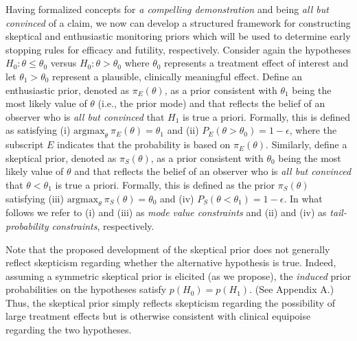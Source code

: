 \documentclass[12pt]{article}
\begin{document}
Having formalized concepts for \textit{a compelling demonstration} and  being \textit{all but convinced} of a claim, we now can develop a structured framework for constructing skeptical and enthusiastic monitoring priors which will be used to determine early stopping rules for efficacy and futility, respectively.
%
Consider again the hypotheses $H_0: \theta \le \theta_0$ versus $H_0: \theta > \theta_0$ where $\theta_0$ represents a 
treatment effect of interest and let $\theta_1>\theta_0$ represent a plausible, clinically meaningful effect.
%
Define an enthusiastic prior, denoted as $\pi_{E}(\theta)$, as a prior consistent with $\theta_1$ being the most 
likely value of $\theta$ (i.e., the prior mode) and that reflects the belief of an observer who is 
\textit{all but convinced} that $H_1$ is true a priori. 
%
Formally, this is defined as satisfying (i) $\text{argmax}_\theta~\pi_E(\theta)=\theta_1$
and (ii) $P_E(\theta >\theta_0)=1-\epsilon$, where the subscript $E$ indicates that the probability is 
based on $\pi_{E}(\theta)$.
%
Similarly, define a skeptical prior, denoted as $\pi_{S}(\theta)$, as a prior consistent with $\theta_0$ being the most 
likely value of $\theta$ and that reflects the belief of an observer who is \textit{all but convinced} that 
$\theta <\theta_1$ is true a priori. 
%
Formally, this is defined as the prior $\pi_{S}(\theta)$ satisfying
(iii) $\text{argmax}_\theta~\pi_S(\theta)=\theta_0$  and (iv) $P_S(\theta <\theta_1)=1-\epsilon$.
%
In what follows we refer to (i) and (iii) as \textit{mode value constraints} and (ii) and (iv) as \textit{tail-probability constraints}, respectively.

Note that the proposed development of the skeptical prior does not generally reflect skepticism regarding whether the alternative hypothesis is true. 
%
Indeed, assuming a symmetric skeptical prior is elicited (as we propose), the \textit{induced} prior probabilities on the hypotheses
satisfy $p(H_0) =  p(H_1)$. (See Appendix A.)
%
%
%
Thus, the skeptical prior simply reflects skepticism regarding the possibility of large treatment effects but is
otherwise consistent with clinical equipoise regarding the two hypotheses.
%
\end{document}
